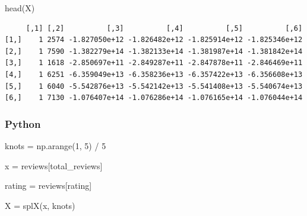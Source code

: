 \documentclass[
  letterpaper,
]{krantz}
\newenvironment{Shaded}{}{}
\newcommand{\DecValTok}[1]{\textcolor[rgb]{0.25,0.63,0.44}{#1}}
\newcommand{\FunctionTok}[1]{\textcolor[rgb]{0.02,0.16,0.49}{#1}}
\newcommand{\NormalTok}[1]{#1}
\newcommand{\OperatorTok}[1]{\textcolor[rgb]{0.40,0.40,0.40}{#1}}
\newcommand{\OtherTok}[1]{\textcolor[rgb]{0.00,0.44,0.13}{#1}}
\newcommand{\SpecialCharTok}[1]{\textcolor[rgb]{0.25,0.44,0.63}{#1}}
\newcommand{\StringTok}[1]{\textcolor[rgb]{0.25,0.44,0.63}{#1}}
\begin{document}
\begin{Shaded}
\end{Shaded}

\begin{Shaded}
\begin{Highlighting}[]
\FunctionTok{head}\NormalTok{(X)}
\end{Highlighting}
\end{Shaded}

\begin{verbatim}
     [,1] [,2]          [,3]          [,4]          [,5]          [,6]
[1,]    1 2574 -1.827050e+12 -1.826482e+12 -1.825914e+12 -1.825346e+12
[2,]    1 7590 -1.382279e+14 -1.382133e+14 -1.381987e+14 -1.381842e+14
[3,]    1 1618 -2.850697e+11 -2.849287e+11 -2.847878e+11 -2.846469e+11
[4,]    1 6251 -6.359049e+13 -6.358236e+13 -6.357422e+13 -6.356608e+13
[5,]    1 6040 -5.542876e+13 -5.542142e+13 -5.541408e+13 -5.540674e+13
[6,]    1 7130 -1.076407e+14 -1.076286e+14 -1.076165e+14 -1.076044e+14
\end{verbatim}

\subsubsection{Python}

\begin{Shaded}
\begin{Highlighting}[]
\NormalTok{knots }\OperatorTok{=}\NormalTok{ np.arange(}\DecValTok{1}\NormalTok{, }\DecValTok{5}\NormalTok{) }\OperatorTok{/} \DecValTok{5}
\end{Highlighting}
\end{Shaded}

\begin{Shaded}
\begin{Highlighting}[]
\NormalTok{x }\OperatorTok{=}\NormalTok{ reviews[}\StringTok{\textquotesingle{}total\_reviews\textquotesingle{}}\NormalTok{]}

\NormalTok{rating }\OperatorTok{=}\NormalTok{ reviews[}\StringTok{\textquotesingle{}rating\textquotesingle{}}\NormalTok{]}

\NormalTok{X }\OperatorTok{=}\NormalTok{ splX(x, knots)}
\end{Highlighting}
\end{Shaded}
\end{document}
